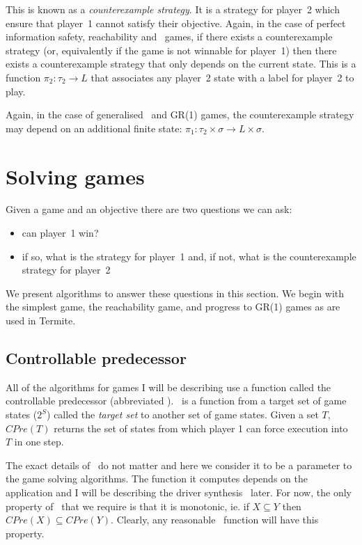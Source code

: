 This is known as a \emph{counterexample strategy}. It is a strategy for player~2 which ensure that player~1 cannot satisfy their objective. Again, in the case of perfect information safety, reachability and \buchi\ games, if there exists a counterexample strategy (or, equivalently if the game is not winnable for player~1) then there exists a counterexample strategy that only depends on the current state. This is a function $\pi_2 : \tau_2 \rightarrow L$ that associates any player~2 state with a label for player~2 to play. 

Again, in the case of generalised \buchi\ and GR(1) games, the counterexample strategy may depend on an additional finite state: $\pi_1 : \tau_2 \times \sigma \rightarrow L \times \sigma$.

\section{Solving games}

Given a game and an objective there are two questions we can ask:
\begin{itemize}
    \item can player~1 win?
    \item if so, what is the strategy for player~1 and, if not, what is the counterexample strategy for player~2
\end{itemize}

We present algorithms to answer these questions in this section. We begin with the simplest game, the reachability game, and progress to GR(1) games as are used in Termite.

\subsection{Controllable predecessor}

All of the algorithms for games I will be describing use a function called the controllable predecessor (abbreviated \cpre). \cpre\ is a function from a target set of game states ($2^S$) called the \emph{target set} to another set of game states. Given a set $T$, $CPre(T)$ returns the set of states from which player 1 can force execution into $T$ in one step. 

The exact details of \cpre\ do not matter and here we consider it to be a parameter to the game solving algorithms. The function it computes depends on the application and I will be describing the driver synthesis \cpre\ later. For now, the only property of \cpre\ that we require is that it is monotonic, ie. if $X \subseteq Y$ then $CPre(X) \subseteq CPre(Y)$. Clearly, any reasonable \cpre\ function will have this property.


